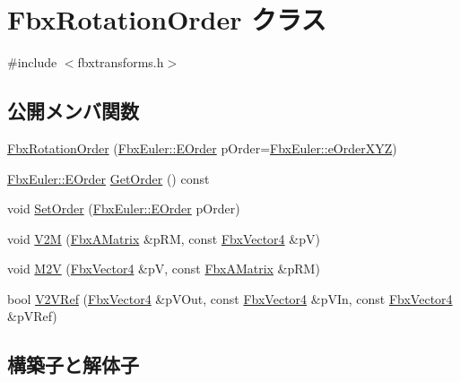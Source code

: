 \hypertarget{class_fbx_rotation_order}{}\section{Fbx\+Rotation\+Order クラス}
\label{class_fbx_rotation_order}


{\ttfamily \#include $<$fbxtransforms.\+h$>$}

\subsection*{公開メンバ関数}
\begin{DoxyCompactItemize}
\item 
\hyperlink{class_fbx_rotation_order_a564325d965730df56b242db19e54eebb}{Fbx\+Rotation\+Order} (\hyperlink{class_fbx_euler_a7d5bec7eedb022b4dae56894ab7a9939}{Fbx\+Euler\+::\+E\+Order} p\+Order=\hyperlink{class_fbx_euler_a7d5bec7eedb022b4dae56894ab7a9939a826dcd420b1fcf49fac1f5ebbbf16894}{Fbx\+Euler\+::e\+Order\+X\+YZ})
\item 
\hyperlink{class_fbx_euler_a7d5bec7eedb022b4dae56894ab7a9939}{Fbx\+Euler\+::\+E\+Order} \hyperlink{class_fbx_rotation_order_a7f846dc5e5676714d56698356917e77d}{Get\+Order} () const
\item 
void \hyperlink{class_fbx_rotation_order_ac6269a975333f6cdc9d34630d0afed79}{Set\+Order} (\hyperlink{class_fbx_euler_a7d5bec7eedb022b4dae56894ab7a9939}{Fbx\+Euler\+::\+E\+Order} p\+Order)
\item 
void \hyperlink{class_fbx_rotation_order_a51aaffe701607ad3ce75f153f8ff1965}{V2M} (\hyperlink{class_fbx_a_matrix}{Fbx\+A\+Matrix} \&p\+RM, const \hyperlink{class_fbx_vector4}{Fbx\+Vector4} \&pV)
\item 
void \hyperlink{class_fbx_rotation_order_af1f1258fdb975cc35fc38456d6f8ba7c}{M2V} (\hyperlink{class_fbx_vector4}{Fbx\+Vector4} \&pV, const \hyperlink{class_fbx_a_matrix}{Fbx\+A\+Matrix} \&p\+RM)
\item 
bool \hyperlink{class_fbx_rotation_order_ae06483cd7b2d959fd38c55135879a2cf}{V2\+V\+Ref} (\hyperlink{class_fbx_vector4}{Fbx\+Vector4} \&p\+V\+Out, const \hyperlink{class_fbx_vector4}{Fbx\+Vector4} \&p\+V\+In, const \hyperlink{class_fbx_vector4}{Fbx\+Vector4} \&p\+V\+Ref)
\end{DoxyCompactItemize}


\subsection{構築子と解体子}
\mbox{\label{class_fbx_rotation_order_a564325d965730df56b242db19e54eebb}} 
